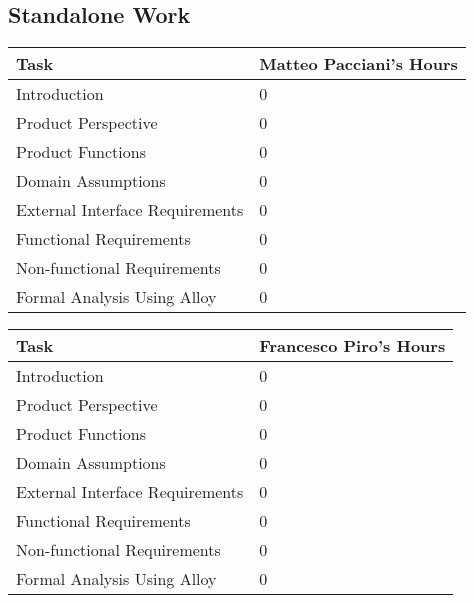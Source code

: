 \subsection{Standalone Work}
\vspace{2mm}
\begin{center}
	\begin{tabular}{| l | p{} |}
	\hline
	\textbf{Task} & \textbf{Matteo Pacciani's Hours} \\ \hline
	Introduction & 0 \\ \hline
	Product Perspective & 0 \\ \hline
	Product Functions & 0 \\ \hline
	Domain Assumptions & 0 \\ \hline
	External Interface Requirements & 0 \\ \hline
	Functional Requirements & 0 \\ \hline
	Non-functional Requirements & 0 \\ \hline
	Formal Analysis Using Alloy & 0 \\
	\hline	
	\end{tabular}
	
	\vspace{2mm}
	
	\begin{tabular}{| l | p{} |}
	\hline
	\textbf{Task} & \textbf{Francesco Piro's Hours} \\ \hline
	Introduction & 0 \\ \hline
	Product Perspective & 0 \\ \hline
	Product Functions & 0 \\ \hline
	Domain Assumptions & 0 \\ \hline
	External Interface Requirements & 0 \\ \hline
	Functional Requirements & 0 \\ \hline
	Non-functional Requirements & 0 \\ \hline
	Formal Analysis Using Alloy & 0 \\
	\hline	
	\end{tabular}
\end{center}